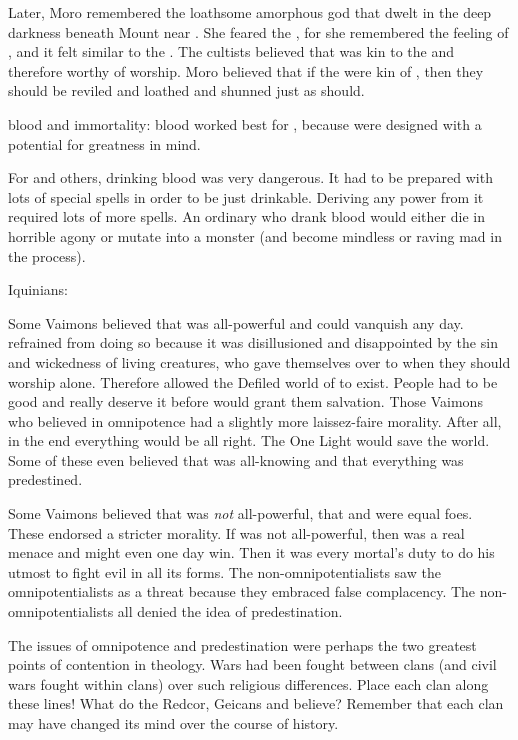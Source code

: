 Later, Moro remembered the loathsome amorphous god \Ubloth that dwelt in the deep darkness beneath Mount \Shrun near \Yormis. 
She feared the \Primordials, for she remembered the feeling of \Ubloth, and it felt similar to the \Primordials.
The \Ubloth cultists believed that \Ubloth was kin to the \Primordials and therefore worthy of worship.
Moro believed that if the \Primordials were kin of \Ubloth, then they should be reviled and loathed and shunned just as \Ubloth should. 


\Dragon blood and immortality:
  \Dragon blood worked best for \scathae, because \scathae were designed with a potential for greatness in mind. 
  
  For \humans and others, drinking \draconian blood was very dangerous.
  It had to be prepared with lots of special spells in order to be just drinkable.
  Deriving any power from it required lots of more spells. 
  An ordinary \human who drank \draconian blood would either die in horrible agony or mutate into a monster (and become mindless or raving mad in the process). 


Iquinians:

  Some Vaimons believed that \Iquin was all-powerful and could vanquish \itzach any day. 
  \Iquin refrained from doing so because it was disillusioned and disappointed by the sin and wickedness of living creatures, who gave themselves over to \itzach when they should worship \iquin alone. 
  Therefore \iquin allowed the Defiled world of \Gehinnom to exist.
  People had to be good and really deserve it before \iquin would grant them salvation.
  Those Vaimons who believed in omnipotence had a slightly more laissez-faire morality.
  After all, in the end everything would be all right. 
  The One Light would save the world. 
  Some of these even believed that \iquin was all-knowing and that everything was predestined. 
  
  Some Vaimons believed that \Iquin was \emph{not} all-powerful, that \iquin and \itzach were equal foes. 
  These endorsed a stricter morality.
  If \iquin was not all-powerful, then \itzach was a real menace and might even one day win.
  Then it was every mortal's duty to do his utmost to fight evil in all its forms. 
  The non-omnipotentialists saw the omnipotentialists as a threat because they embraced false complacency. 
  The non-omnipotentialists all denied the idea of predestination. 
  
  The issues of omnipotence and predestination were perhaps the two greatest points of contention in \iquinian theology.
  Wars had been fought between clans (and civil wars fought within clans) over such religious differences.
  Place each clan along these lines!
  What do the Redcor, Geicans and \Telcras believe?
  Remember that each clan may have changed its mind over the course of history.
  
